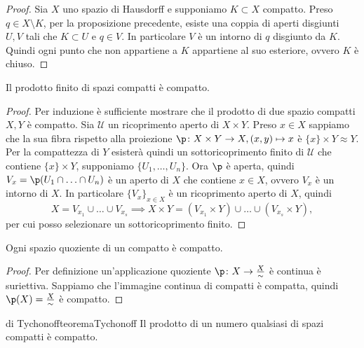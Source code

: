 \begin{proof}
	Sia \(X\) uno spazio di Hausdorff e supponiamo \(K\subset X\) compatto.
	Preso \(q\in X\setminus K\), per la proposizione precedente, esiste una coppia di aperti disgiunti \(U,V\) tali che \(K\subset U\) e \(q\in V\).
	In particolare \(V\) è un intorno di \(q\) disgiunto da \(K\).
	Quindi ogni punto che non appartiene a \(K\) appartiene al suo esteriore, ovvero \(K\) è chiuso.
\end{proof}

\begin{pr}\label{pr:spaziCompatti4}
	Il prodotto finito di spazi compatti è compatto.
\end{pr}

\begin{proof}
	Per induzione è sufficiente mostrare che il prodotto di due spazio compatti \(X,Y\) è compatto.
	Sia \(\mathcal{U}\) un ricoprimento aperto di \(X\times Y\).
	Preso \(x\in X\) sappiamo che la sua fibra rispetto alla proiezione \(\p\colon X\times Y \to X, (x,y)\mapsto x\) è \(\{x\}\times Y \approx Y\).
	Per la compattezza di \(Y\) esisterà quindi un sottoricoprimento finito di \(\mathcal{U}\) che contiene \(\{x\}\times Y\), supponiamo \(\{U_1,\ldots,U_n\}\).
	Ora \(\p\) è aperta, quindi \(V_x=\p(U_1 \cap \ldots \cap U_n)\) è un aperto di \(X\) che contiene \(x\in X\), ovvero \(V_x\) è un intorno di \(X\).
	In particolare \(\{V_x\}_{x\in X}\) è un ricoprimento aperto di \(X\), quindi
	\[
		X = V_{x_1} \cup \ldots \cup V_{x_s} \implies X \times Y = (V_{x_1} \times Y ) \cup \ldots \cup (V_{x_s} \times Y),
	\]
	per cui posso selezionare un sottoricoprimento finito.
\end{proof}

\begin{pr}\label{pr:spaziCompatti5}
	Ogni spazio quoziente di un compatto è compatto.
\end{pr}

\begin{proof}
	Per definizione un'applicazione quoziente \(\p\colon X \to \frac{X}{\sim}\) è continua è suriettiva.
	Sappiamo che l'immagine continua di compatti è compatta, quindi \(\p(X)=\frac{X}{\sim}\) è compatto.
\end{proof}

\begin{teor}{di Tychonoff}{teoremaTychonoff}
	Il prodotto di un numero qualsiasi di spazi compatti è compatto.
\end{teor}


